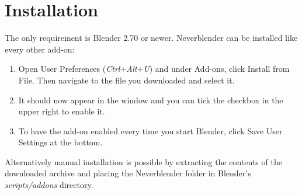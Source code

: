 \chapter{Installation}
The only requirement is Blender 2.70 or newer. Neverblender can be installed
like every other add-on: 
\begin{enumerate}
\item Open User Preferences (\textit{Ctrl}+\textit{Alt}+\textit{U}) and under Add-ons, 
click Install from File. Then navigate to the file you downloaded and select it.
\item It should now appear in the window and you can tick the checkbox in the upper right to enable it.
\item To have the add-on enabled every time you start Blender, click Save User Settings at the bottom.
\end{enumerate}

Alternatively manual installation is possible by extracting the contents of the
downloaded archive and placing the Neverblender folder in Blender's \textit{scripts/addons} directory.
